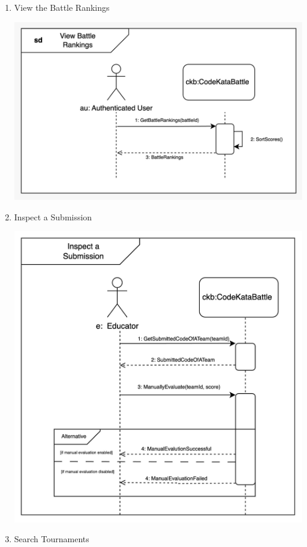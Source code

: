 \begin{enumerate}
    \newpage
    \item View the Battle Rankings
    \begin{center}
            \includegraphics[scale=0.2]{Images/sequence_diagrams/SD-view_battle_rankings.jpeg}
    \end{center}
    \item Inspect a Submission
    \begin{center}
            \includegraphics[scale=0.2]{Images/sequence_diagrams/SG-inspect_a_submission.jpeg}
    \end{center}
    \item Search Tournaments

\end{enumerate}
